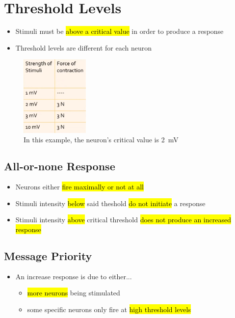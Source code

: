 \documentclass[a4paper,12pt]{article}
\begin{document}
\section{Threshold Levels}
\begin{itemize}
    \item{Stimuli must be \hl{above a critical value} in order to produce a response}
    \item{Threshold levels are different for each neuron}
\end{itemize}

\begin{figure}[H]
    \centering
    \includegraphics[width=0.3\textwidth]{threshold}
    \caption{In this example, the neuron's critical value is \SI{2}{\mV}}
\end{figure}

\subsection{All-or-none Response}
\begin{itemize}
    \item{Neurons either \hl{fire maximally or not at all}}
    \item{Stimuli intensity \hl{below} said theshold \hl{do not initiate} a response}
    \item{Stimuli intensity \hl{above} critical threshold \hl{does not produce an increased response}}
\end{itemize}

\subsection{Message Priority}
\begin{itemize}
    \item{
            An increase response is due to either...
            \begin{itemize}
                \item{\hl{more neurons} being stimulated}
                \item{some specific neurons only fire at \hl{high threshold levels}}
            \end{itemize}
        }
\end{itemize}
\end{document}
